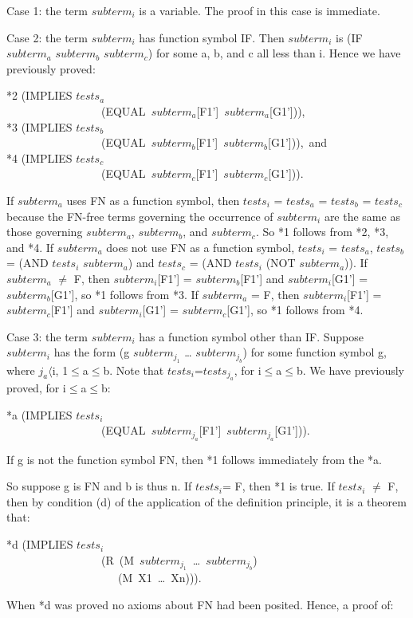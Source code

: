 \documentclass[10pt]{book}
\newenvironment{pubasis}{\begin{flushleft}}{\end{flushleft}}
\begin{document}
Case 1:  the term $subterm_{i}$ is a variable.  The proof in this case is immediate.

Case 2:  the term $subterm_{i}$ has function symbol IF.  Then $subterm_{i}$
is (IF $subterm_{a}$ $subterm_{b}$ $subterm_{c}$) for some a, b, and c
all less than i.  Hence we have previously proved:
\begin{pubasis}
*2	(IMPLIES $tests_{a}$\\
~~~~~~~~~~~~~~~~~(EQUAL~$subterm_{a}$[F1']~$subterm_{a}$[G1'])),\\

*3	(IMPLIES $tests_{b}$\\
~~~~~~~~~~~~~~~~~(EQUAL~$subterm_{b}$[F1']~$subterm_{b}$[G1'])),~and\\

*4	(IMPLIES $tests_{c}$\\
~~~~~~~~~~~~~~~~~(EQUAL~$subterm_{c}$[F1']~$subterm_{c}$[G1'])).\\
\end{pubasis}
If $subterm_{a}$ uses FN as a function symbol, then $tests_{i}$ = $tests_{a}$ =
$tests_{b}$ = $tests_{c}$ because the FN-free terms governing the occurrence
of $subterm_{i}$ are the same as those governing $subterm_{a}$, $subterm_{b}$, and
$subterm_{c}$.  So *1 follows from *2, *3, and *4.  If $subterm_{a}$
does not use FN as a function symbol, $tests_{i}$ = $tests_{a}$, $tests_{b}$ =
(AND $tests_{i}$ $subterm_{a}$) and $tests_{c}$ = (AND $tests_{i}$ (NOT $subterm_{a}$)).
If $subterm_{a}$ $\neq$ F, then $subterm_{i}$[F1'] = $subterm_{b}$[F1'] and
$subterm_{i}$[G1'] = $subterm_{b}$[G1'], so *1 follows from *3.  If $subterm_{a}$ = F,
then $subterm_{i}$[F1'] = $subterm_{c}$[F1'] and $subterm_{i}$[G1'] =
$subterm_{c}$[G1'], so *1 follows from *4.

Case 3:  the term $subterm_{i}$ has a function symbol other than IF.
Suppose $subterm_{i}$ has the form (g $subterm_{j_{1}}$ \ldots{} $subterm_{j_{b}}$)
for some function symbol g, where $j_{a} \langle$i, 1$\leq$a$\leq$b.
Note that $tests_{i}$=$tests_{j_{a}}$, for i$\leq$a$\leq$b.  We
have previously proved, for i$\leq$a$\leq$b:
\begin{pubasis}
*a	(IMPLIES $tests_{i}$\\
~~~~~~~~~~~~~~~~~(EQUAL~$subterm_{j_{a}}$[F1']~$subterm_{j_{a}}$[G1'])).\\
\end{pubasis}
If g is not the function symbol FN, then *1 follows immediately from the *a.

So suppose g is FN and b is thus n.
If $tests_{i}$= F, then *1 is true.  If $tests_{i}$ $\neq$ F, then
by condition (d) of the application of the definition principle,
it is a theorem that:
\begin{pubasis}
*d	(IMPLIES $tests_{i}$\\
~~~~~~~~~~~~~~~~~(R~(M~$subterm_{j_{1}}$~\ldots{}~$subterm_{j_{b}}$)\\
~~~~~~~~~~~~~~~~~~~~(M~X1~\ldots{}~Xn))).\\
\end{pubasis}
When *d was proved no axioms about FN had been posited.  Hence, a proof
of:
\end{document}
